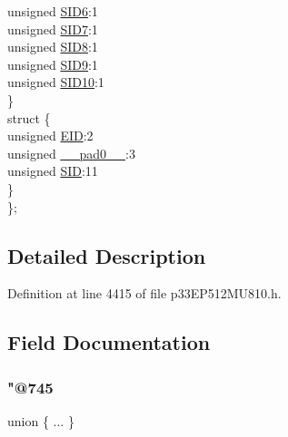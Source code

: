 \begin{DoxyCompactItemize}
\begin{tabbing}
\>\>unsigned \hyperlink{structtag_c1_r_x_f12_s_i_d_b_i_t_s_a70d70952133eb2389d5c326f9f0e8035}{SID6}:1\\
\>\>unsigned \hyperlink{structtag_c1_r_x_f12_s_i_d_b_i_t_s_a34097fb76decd431701fa2d86a22328e}{SID7}:1\\
\>\>unsigned \hyperlink{structtag_c1_r_x_f12_s_i_d_b_i_t_s_afe74894633244fdb0b0c01b4e8c522e7}{SID8}:1\\
\>\>unsigned \hyperlink{structtag_c1_r_x_f12_s_i_d_b_i_t_s_a33587704948067005c2a6a3ccc503c99}{SID9}:1\\
\>\>unsigned \hyperlink{structtag_c1_r_x_f12_s_i_d_b_i_t_s_a1a9084031c7f5fb16007feeebf0d8216}{SID10}:1\\
\>\} \\
\>struct \{\\
\>\>unsigned \hyperlink{structtag_c1_r_x_f12_s_i_d_b_i_t_s_ae80b378c9141f7c03e0b4e55b5f4b54d}{EID}:2\\
\>\>unsigned \hyperlink{structtag_c1_r_x_f12_s_i_d_b_i_t_s_adf71f3d8410c1f1dbbc96680a92c49af}{\_\_pad0\_\_}:3\\
\>\>unsigned \hyperlink{structtag_c1_r_x_f12_s_i_d_b_i_t_s_af88edf93b2fee2432665bd84f51287e4}{SID}:11\\
\>\} \\
\}; \\

\end{tabbing}\end{DoxyCompactItemize}


\subsection{Detailed Description}


Definition at line 4415 of file p33\+E\+P512\+M\+U810.\+h.



\subsection{Field Documentation}
\mbox{\label{structtag_c1_r_x_f12_s_i_d_b_i_t_s_a3c92fc7acdc315d6e7b6be184e72d759}} 
\subsubsection{\texorpdfstring{"@745}{@745}}
{\footnotesize\ttfamily union \{ ... \} }

\mbox{\label{structtag_c1_r_x_f12_s_i_d_b_i_t_s_adf71f3d8410c1f1dbbc96680a92c49af}} 
